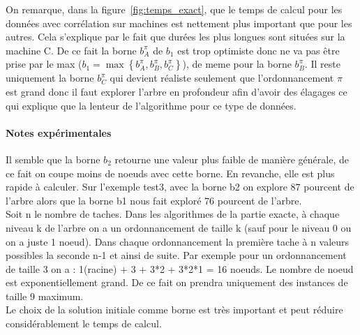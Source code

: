 \documentclass[a4paper, 10pt]{article}
\begin{document}
	On remarque, dans la figure~\ref{fig:temps_exact}, que le temps de calcul pour les données avec corrélation sur machines est nettement plus important que pour les autres. Cela s'explique par le fait que durées les plus longues sont situées sur la machine C. De ce fait la borne $b^\pi_A$ de $b_1$ est trop optimiste donc ne va pas être prise par le max ($b_1 = \max\left\{b^\pi_A, b^\pi_B, b^\pi_C\right\}$), de meme pour la borne $b^\pi_B$. Il reste uniquement la borne $b^\pi_C$ qui devient réaliste seulement que l'ordonnancement $\pi$ est grand donc il faut explorer l'arbre en profondeur afin d'avoir des élagages ce qui explique que la lenteur de l'algorithme pour ce type de données.
		
		\paragraph{Notes expérimentales}{Il semble que la borne $b_2$ retourne une valeur plus faible de manière générale, de ce fait on coupe moins de noeuds avec cette borne. En revanche, elle est plus rapide à calculer. Sur l'exemple test3, avec la borne b2 on explore 87 pourcent de l'arbre alors que la borne b1 nous fait exploré 76 pourcent de l'arbre. \\
                  Soit n le nombre de taches.
                  Dans les algorithmes de la partie exacte, à chaque niveau k de l'arbre on a un ordonnancement de taille k (sauf pour le niveau 0 ou on a juste 1 noeud). Dans chaque ordonnancement la première tache à n valeurs possibles la seconde n-1 et ainsi de suite. Par exemple pour un ordonnancement de taille 3 on a : 1(racine) + 3 + 3*2 + 3*2*1 = 16 noeuds. Le nombre de noeud est exponentiellement grand. De ce fait on prendra uniquement des instances de taille 9 maximum. \\
                  Le choix de la solution initiale comme borne est très important et peut réduire considérablement le temps de calcul.
                }
\end{document}

